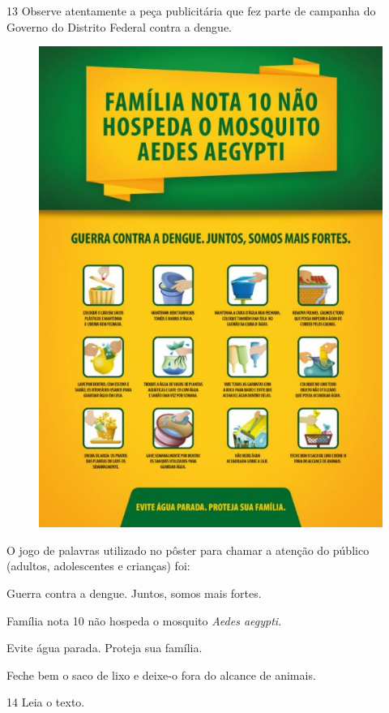 \pagebreak
\num{13} Observe atentamente a peça publicitária que fez parte de campanha do
Governo do Distrito Federal contra a dengue.

\begin{figure}[htpb!]
\centering
\includegraphics[width=.6\textwidth]{./media/simulados/image2.jpeg}
\end{figure}


O jogo de palavras utilizado no pôster para chamar a atenção do público
(adultos, adolescentes e crianças) foi:

\begin{escolha}
\item Guerra contra a dengue. Juntos, somos mais fortes.

\item Família nota 10 não hospeda o mosquito \emph{Aedes aegypti}.

\item Evite água parada. Proteja sua família.

\item Feche bem o saco de lixo e deixe-o fora do alcance de animais.
\end{escolha}

\pagebreak
\num{14} Leia o texto.

